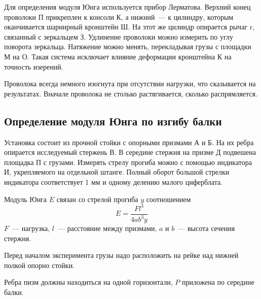 \newpage
    

Для определения модуля Юнга используется прибор Лерматова.
Верхний конец проволоки П прикреплен к консоли К, а  нижний~---
к цилиндру, которым оканчивается шарнирный кронштейн Ш. На этот же
цилиндр опирается рычаг r, связанный с зеркальцем З. Удлинение проволоки можно
измерить по углу поворота зеркальца. Натяжение можно менять, перекладывая грузы с площадки М на О.
Такая система исключает влияние деформации кронштейна К на точность изерений.

Проволока всегда немного изогнута при отсутствии нагрузки, что сказывается на результатах.
Вначале проволока не столько растягивается, сколько распрямляется. 

\subsection{Определение модуля Юнга по изгибу балки}

Установка состоит из прочной стойки с опорными призмами А и Б. На их ребра
опирается исследуемый стержень В. В середине стержня на призме Д подвешена площадка П с грузами.
Измерять стрелу прогиба можно с помощью индикатора И, укрепляемого на отдельной штанге. Полный
оборот большой стрелки индикатора соответствует 1 мм и одному делению малого циферблата.

Модуль Юнга $E$ связан со стрелой прогиба $y$ соотношением 
\[E=\frac{Fl^3}{4ab^3y}\]
$F$~--- нагрузка, $l$~---   расстояние между призмами, $a$ и $b$~--- высота сечения стержня.

Перед началом эксперимента грузы надо расположить на рейке над нижней полкой опорно стойки.

Ребра пизм должны находиться на одной горизонтали, $P$ приложена по середине балки.
